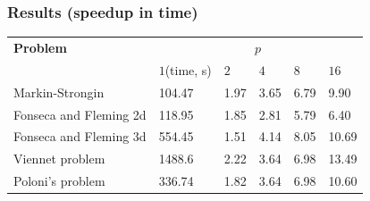 \documentclass[aspectratio=1610]{beamer}
\begin{document}
%
%
\begin{frame}
  \frametitle{Results (speedup in time)}

  \begin{table}[ht]
    \centering
    \begin{tabular}{|l|p{1.6cm}|p{1.5cm}|p{1.5cm}|p{1.5cm}|p{1.5cm}|}
  \hline
  \textbf{Problem} & \multicolumn{5}{c|}{\(p\)}\\
  \cline{2-6}
  &\(1\)(time, s) & \(2\) & \(4\) & \(8\) & \(16\)\\
  \hline
  Markin-Strongin & 104.47 & 1.97 & 3.65 & 6.79 & 9.90 \\
  \hline
  Fonseca and Fleming 2d & 118.95 & 1.85 & 2.81 & 5.79 & 6.40 \\
  \hline
  Fonseca and Fleming 3d & 554.45 & 1.51 & 4.14 & 8.05 & 10.69 \\
  \hline
  Viennet problem & 1488.6 & 2.22 & 3.64 & 6.98 & 13.49\\
  \hline
  Poloni's problem & 336.74 & 1.82 & 3.64 & 6.98 & 10.60 \\
  \hline
  \end{tabular}
  \end{table}
\end{frame}
\end{document}
